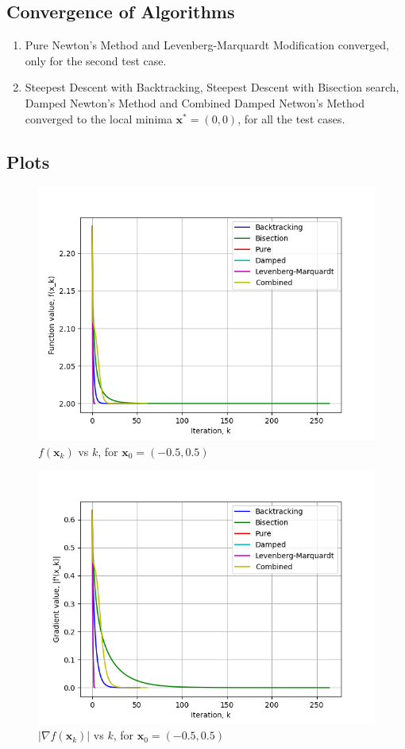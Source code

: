 \documentclass[a4paper]{article}
\begin{document}
\subsection{Convergence of Algorithms}

\begin{enumerate}

\item Pure Newton's Method and Levenberg-Marquardt Modification converged, only for the second test case.

\item Steepest Descent with Backtracking, Steepest Descent with Bisection search, Damped Newton's Method and Combined Damped Netwon's Method converged to the local minima $\textbf{x}^* = (0, 0)$, for all the test cases.

\end{enumerate}

\subsection{Plots}

\begin{figure}[H]
      \centering
      \includegraphics[width=.75\textwidth]{func_1_vals.png}
      \caption{$f(\textbf{x}_k)$ vs $k$, for $\textbf{x}_0 = (-0.5, 0.5)$}
\end{figure}

\begin{figure}[H]
    \centering
    \includegraphics[width=.75\textwidth]{func_1_grad.png}
    \caption{$|\nabla f(\textbf{x}_k)|$ vs $k$, for $\textbf{x}_0 = (-0.5, 0.5)$}
\end{figure}
\end{document}
